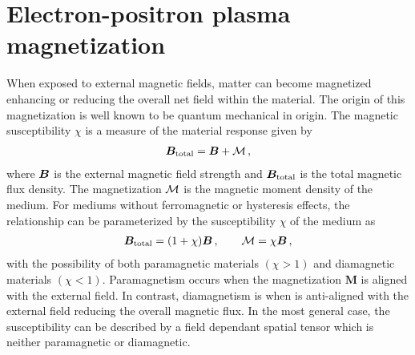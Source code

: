 \section{Electron-positron plasma magnetization}
\label{sec:magnetization}
\noindent When exposed to external magnetic fields, matter can become magnetized enhancing or reducing the overall net field within the material. The origin of this magnetization is well known to be quantum mechanical in origin. The magnetic susceptibility $\chi$ is a measure of the material response given by
\begin{align}
 \label{totalmag:1}
 \boldsymbol{B}_{\rm total} = \boldsymbol{B} + {\cal M}\,,
\end{align}
where $\boldsymbol{B}$ is the external magnetic field strength and $\boldsymbol{B}_{\rm total}$ is the total magnetic flux density. The magnetization ${\cal M}$ is the magnetic moment density of the medium. For mediums without ferromagnetic or hysteresis effects, the relationship can be parameterized by the susceptibility $\chi$ of the medium as
\begin{align}
 \label{totalmag:2}
 \boldsymbol{B}_{\rm total} = (1+\chi)\boldsymbol{B}\,,\qquad {\cal M} = \chi\boldsymbol{B}\,,
\end{align}
with the possibility of both paramagnetic materials $(\chi>1)$ and diamagnetic materials $(\chi<1)$. Paramagnetism occurs when the magnetization $\textbf{M}$ is aligned with the external field. In contrast, diamagnetism is when is anti-aligned with the external field reducing the overall magnetic flux. In the most general case, the susceptibility can be described by a field dependant spatial tensor which is neither paramagnetic or diamagnetic.

